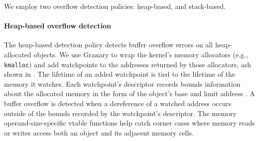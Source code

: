 \documentclass[letterpaper,twocolumn,10pt]{article}
\begin{document}
We employ two overflow detection policies: heap-based, and stack-based. %


\paragraph{Heap-based overflow detection\label{sec:heap_overflow}}
The heap-based detection policy detects buffer overflow errors on all heap-allocated objects. We use Granary to wrap the kernel's memory allocators (e.g., \texttt{kmalloc}) and add watchpoints to the addresses returned by those allocators, ash shown in . The lifetime of an added watchpoint is tied to the lifetime of the memory it watches. Each watchpoint's descriptor records bounds information about the allocated memory in the form of the object's base and limit address \cite{BccFatPointers}. A buffer overflow is detected when a dereference of a watched address occurs outside of the bounds recorded by the watchpoint's descriptor. %
The memory operand-size-specific vtable functions help catch corner cases where memory reads or writes access both an object and its adjacent memory cells.%

\end{document}
